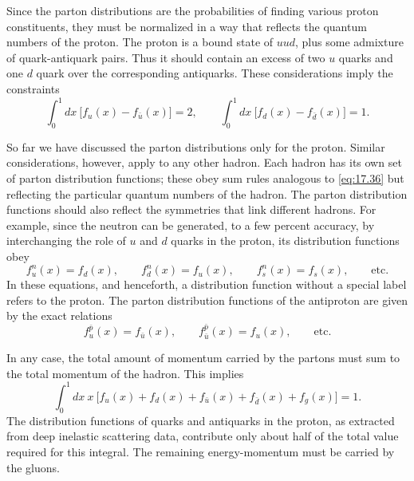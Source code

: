 Since the parton distributions are the probabilities of finding various proton
constituents, they must be normalized in a way that reflects the quantum
numbers of the proton.  The proton is a bound state of $uud$, plus some
admixture of quark-antiquark pairs.  Thus it should contain an excess of two
$u$ quarks and one $d$ quark over the corresponding antiquarks.  These
considerations imply the constraints
\begin{equation}
  \int_0^1 dx\ \bigl[ f_u(x) - f_{\bar{u}}(x) \bigr] = 2,\qquad
  \int_0^1 dx\ \bigl[ f_d(x) - f_{\bar{d}}(x) \bigr] = 1 .
  \label{eq:17.36}
\end{equation}

So far we have discussed the parton distributions only for the proton.
Similar considerations, however, apply to any other hadron.  Each hadron has
its own set of parton distribution functions; these obey sum rules analogous
to \eqref{eq:17.36} but reflecting the particular quantum numbers of the
hadron.  The parton distribution functions should also reflect the symmetries
that link different hadrons.  For example, since the neutron can be
generated, to a few percent accuracy, by interchanging the role of $u$ and
$d$ quarks in the proton, its distribution functions obey
\begin{equation}
  f_u^n(x) = f_d(x),\qquad f_d^n(x) = f_u(x),\qquad
  f_s^n(x) = f_s(x),\qquad \text{etc.}
  \label{eq:17.37}
\end{equation}
In these equations, and henceforth, a distribution function without a special
label refers to the proton.  The parton distribution functions of the
antiproton are given by the exact relations
\begin{equation}
  f_u^{\bar{p}}(x) = f_{\bar{u}}(x),\qquad
  f_{\bar{u}}^{\bar{p}}(x) = f_u(x),\qquad \text{etc.}
  \label{eq:17.38}
\end{equation}

In any case, the total amount of momentum carried by the partons must sum to
the total momentum of the hadron.  This implies
\begin{equation}
  \int_0^1 dx\ x\ \bigl[ f_u(x) + f_d(x) + f_{\bar{u}}(x) + f_{\bar{d}}(x)
    + f_g(x) \bigr] = 1 .
  \label{eq:17.39}
\end{equation}
The distribution functions of quarks and antiquarks in the proton, as
extracted from deep inelastic scattering data, contribute only about half of
the total value required for this integral.  The remaining energy-momentum
must be carried by the gluons.

